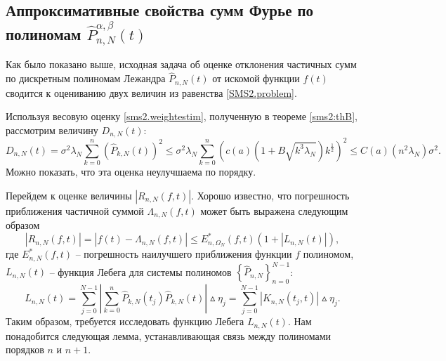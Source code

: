 






\subsection{Аппроксимативные свойства сумм Фурье по полиномам $\hat{P}_{n,N}^{\alpha,\beta}(t)$}


Как было показано выше, исходная задача об оценке отклонения частичных сумм по дискретным полиномам Лежандра $\hat P_{n,N}(t)$ от искомой функции $f(t)$ сводится к оцениванию двух величин из равенства \eqref{SMS2.problem}.

Используя весовую оценку \eqref{sms2.weightestim}, полученную в теореме \ref{sms2:thB}, рассмотрим величину $D_{n,N}(t)$:
\begin{equation*}
D_{n,N}(t) = \sigma^2\lambda_N\sum\limits_{k=0}^{n} \left(\hat{P}_{k,N}(t)\right)^2 \leq \sigma^2\lambda_N \sum\limits_{k=0}^{n} \left(c(a) \left(1 + B\sqrt{k^{3}\lambda_N}\right) k^{\frac12}\right)^2 \leq C(a) (n^2 \lambda_N) \sigma^2.
\end{equation*}
Можно показать, что эта оценка неулучшаема по порядку.



Перейдем к оценке величины $\left| R_{n,N}(f,t)\right|$. Хорошо известно, что погрешность приближения частичной суммой $\Lambda_{n,N}(f,t)$ может быть выражена следующим образом
\begin{equation*}
\left| R_{n,N}(f,t)\right| = \left| f(t) - \Lambda_{n,N}(f,t) \right| \leq E^*_{n,\Omega_N}(f,t) \left( 1 + |L_{n,N}(t)|\right),
\end{equation*}
где $E^*_{n,N}(f,t)$ -- погрешность наилучшего приближения функции $f$ полиномом, $L_{n,N}(t)$ -- функция Лебега для системы полиномов $\left\{\hat P_{n,N}\right\}_{n=0}^{N-1}$:
\begin{equation*}
L_{n,N}(t) = \sum\limits_{j=0}^{N-1} \left|\sum\limits_{k=0}^{n}\hat P_{k,N}(t_j)\hat P_{k,N}(t)\right|\vartriangle\eta_{j} =
\sum\limits_{j=0}^{N-1} \left|K_{n,N}(t_j,t)\right|\vartriangle\eta_{j}.
\end{equation*}
Таким образом, требуется исследовать функцию Лебега $L_{n,N}(t)$. Нам понадобится следующая лемма, устанавливающая связь между полиномами порядков $n$ и $n+1$.


